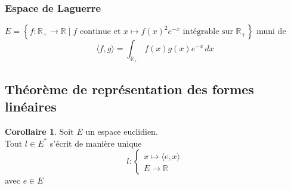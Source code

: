 \documentclass[10pt,a4paper]{article}
\theoremstyle{definition}
\newtheorem{corollary}[proposition]{Corollaire}
\begin{document}
\subsubsection{Espace de Laguerre}
\noindent \(E = \left\{ f: \mathbb{R_+} \to \mathbb{R} \mid f \text{ continue et } x \mapsto f(x)^2 e^{-x} \text{ intégrable sur } \mathbb{R}_+ \right\}\) muni de
\[\langle f, g \rangle = \int_{\mathbb{R}_+} f(x) g(x) e^{-x} \,dx\]

\subsection{Théorème de représentation des formes linéaires}
\begin{corollary}
    Soit \(E\) un espace euclidien. \\
    Tout \(l \in E^*\) s'écrit de manière unique
    \[l: \begin{cases}
        x \mapsto \langle e, x \rangle \\
        E \to \mathbb{R}
    \end{cases}\]
    avec \(e \in E\)
\end{corollary}
\end{document}
